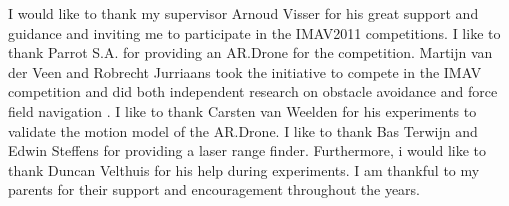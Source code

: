 I would like to thank my supervisor Arnoud Visser for his great support and guidance and inviting me to participate in the IMAV2011 competitions.
I like to thank Parrot S.A. for providing an AR.Drone for the competition.
Martijn van der Veen and Robrecht Jurriaans took the initiative to compete in the IMAV competition and did both independent research on obstacle avoidance \cite{Jurriaans2011} and force field navigation \cite{VanDerVeen2011}.
I like to thank Carsten van Weelden for his experiments to validate the motion model of the AR.Drone. 
I like to thank Bas Terwijn and Edwin Steffens for providing a laser range finder.
Furthermore, i would like to thank Duncan Velthuis for his help during experiments.
I am thankful to my parents for their support and encouragement throughout the years.